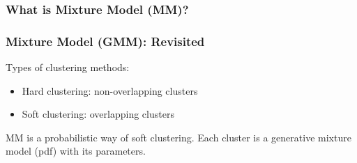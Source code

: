 \documentclass[notes]{beamer}
\begin{document}
{ %
    \begin{frame}[plain]
     \end{frame}
}


\subsubsection{What is Mixture Model (MM)?}
\begin{frame}

\end{frame}

\begin{frame}
    \frametitle{Mixture Model (GMM): Revisited}
    Types of clustering methods:
    \begin{itemize}
        \item Hard clustering: non-overlapping clusters
        \item Soft clustering: overlapping clusters
    \end{itemize}

    \vspace{0.1in}
    \pause
    MM is a probabilistic way of soft clustering.
    Each cluster is a generative mixture model (pdf) with its parameters.


\end{frame}
\end{document}
